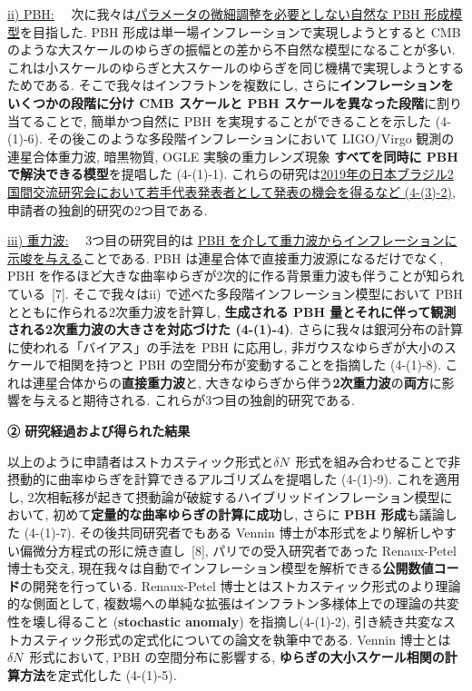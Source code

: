 \documentclass[11pt,a4paper,uplatex,twoside,dvipdfmx]{ujarticle} 	%
\renewcommand{\emph}[1]{{\sffamily\gtfamily\bfseries #1}}
\newcommand{\subsubject}[1]{\noindent \ul{#1}~~}
\newcommand{\研究課題名}{\mgfamily ストカスティック形式、原始ブラックホール、重力波観測から迫るインフレーション}
\newcommand{\研究機関名}{\mgfamily 名古屋大学}
\newcommand{\申請者氏名}{\mgfamily 多田 祐一郎}
\newcommand{\研究代表者氏名}{\申請者氏名}
\newcommand{\研究期間の最終元号年度}{34}	%
\begin{document}
{	\vspace{3pt}
	\subsubject{ii) PBH:}
	次に我々は\ul{パラメータの微細調整を必要としない自然な PBH 形成模型}を目指した.
	PBH 形成は単一場インフレーションで実現しようとすると CMB のような大スケールのゆらぎの振幅との差から不自然な模型になることが多い.
	これは小スケールのゆらぎと大スケールのゆらぎを同じ機構で実現しようとするためである.
	そこで我々はインフラトンを複数にし, さらに\emph{インフレーションをいくつかの段階に分け CMB スケールと PBH スケールを異なった段階}に割り当てることで,
	簡単かつ自然に PBH を実現することができることを示した (4-(1)-6).
	その後このような多段階インフレーションにおいて LIGO/Virgo 観測の連星合体重力波, 暗黒物質, OGLE 実験の重力レンズ現象 \emph{すべてを同時に PBH で解決できる模型}を提唱した (4-(1)-1).
	これらの研究は\ul{2019年の日本ブラジル2国間交流研究会において若手代表発表者として発表の機会を得るなど (4-(3)-2)}, 申請者の独創的研究の2つ目である.
	
	
	\vspace{3pt}
	\subsubject{iii) 重力波:}
	3つ目の研究目的は \ul{PBH を介して重力波からインフレーションに示唆を与える}ことである.
	PBH は連星合体で直接重力波源になるだけでなく, PBH を作るほど大きな曲率ゆらぎが2次的に作る背景重力波も伴うことが知られている~[7].
	そこで我々はii) で述べた多段階インフレーション模型において PBH とともに作られる2次重力波を計算し,
	\emph{生成される PBH 量とそれに伴って観測される2次重力波の大きさを対応づけた (4-(1)-4)}.
	さらに我々は銀河分布の計算に使われる「バイアス」の手法を PBH に応用し, 
	非ガウスなゆらぎが大小のスケールで相関を持つと PBH の空間分布が変動することを指摘した (4-(1)-8).
	これは連星合体からの\emph{直接重力波}と, 大きなゆらぎから伴う\emph{2次重力波}の\emph{両方}に影響を与えると期待される.
	これらが3つ目の独創的研究である.

	
	
	
	\begin{mdframed}[roundcorner=0.5zw,
	innertopmargin=0.8zw,innerbottommargin=0.8zw,
	linecolor=black!50,linewidth=0.2zw,
	backgroundcolor=black!10]
	{\bfseries\gtfamily\sffamily\large ② 研究経過および得られた結果}
	\end{mdframed}
	
	\vspace{-10pt}
	以上のように申請者はストカスティック形式と$\delta N$~形式を組み合わせることで非摂動的に曲率ゆらぎを計算できるアルゴリズムを提唱した (4-(1)-9).
	これを適用し, 2次相転移が起きて摂動論が破綻するハイブリッドインフレーション模型において, 初めて\emph{定量的な曲率ゆらぎの計算に成功}し, さらに \emph{PBH 形成}も議論した (4-(1)-7).
	その後共同研究者でもある Vennin 博士が本形式をより解析しやすい偏微分方程式の形に焼き直し~[8],
	パリでの受入研究者であった Renaux-Petel 博士も交え, 現在我々は自動でインフレーション模型を解析できる\emph{公開数値コード}の開発を行っている.
	Renaux-Petel 博士とはストカスティック形式のより理論的な側面として,
	複数場への単純な拡張はインフラトン多様体上での理論の共変性を壊し得ること (\emph{stochastic anomaly}) を指摘し(4-(1)-2),
	引き続き共変なストカスティック形式の定式化についての論文を執筆中である.
	Vennin 博士とは $\delta N$~形式において, PBH の空間分布に影響する, \emph{ゆらぎの大小スケール相関の計算方法}を定式化した (4-(1)-5).
	
}
\end{document}
